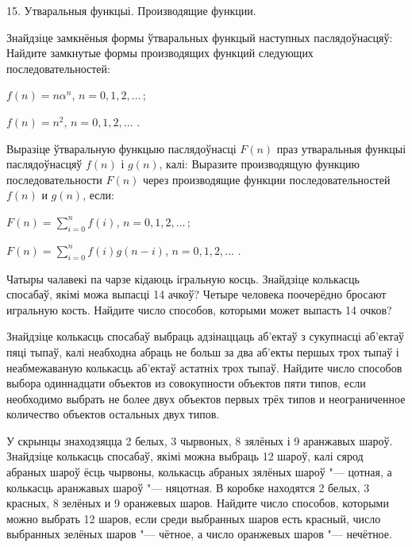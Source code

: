 



\biLangHeader
{15. Утваральныя функцыі.}
{Производящие функции.}

\begin{problemList}

\problemItemWithCommonPart
{Знайдзіце замкнёныя формы ўтваральных функцый наступных паслядоўнасцяў:}
{Найдите замкнутые формы производящих функций следующих последовательностей:}
{%
\begin{belarusianEnumerate}
  \item $f(n) = n\alpha^n$, $n = 0, 1, 2, \ldots\, $;
  \item $f(n) = n^2$, $n = 0, 1, 2, \ldots\,\, $.
\end{belarusianEnumerate}
}

\smallskip

\problemItemWithCommonPart
{Выразіце ўтваральную функцыю паслядоўнасці $F(n)$ праз утваральныя функцыі
паслядоўнасцяў $f(n)$ і $g(n)$, калі:}
{Выразите производящую функцию последовательности $F(n)$ через производящие
функции последовательностей $f(n)$ и $g(n)$, если:}
{%
\begin{belarusianEnumerate}
  \item $F(n) = \sum \limits _{i = 0}^n f(i)$, $n = 0, 1, 2, \ldots\, $;
  \item $F(n) = \sum \limits _{i = 0}^n f(i)g(n - i)$, $n = 0, 1, 2, \ldots\,\, $.
\end{belarusianEnumerate}
}

\medskip

\problemItemSimple
{Чатыры чалавекі па чарзе кідаюць ігральную косць. Знайдзіце колькасць спосабаў,
якімі можа выпасці 14 ачкоў?}
{Четыре человека поочерёдно бросают игральную кость. Найдите число способов,
которыми может выпасть 14 очков?}

\bigskip

\problemItemSimple
{Знайдзіце колькасць спосабаў выбраць адзінаццаць аб'ектаў з сукупнасці аб'ектаў
пяці тыпаў, калі неабходна абраць не больш за два аб'екты першых трох тыпаў і неабмежаваную
колькасць аб'ектаў астатніх трох тыпаў.}
{Найдите число способов выбора одиннадцати объектов из совокупности объектов
пяти типов, если необходимо выбрать не более двух объектов первых трёх типов и
неограниченное количество объектов остальных двух типов.}

\bigskip

\problemItemSimple
{У скрынцы знаходзяцца 2 белых, 3 чырвоных, 8 зялёных і 9 аранжавых шароў.
Знайдзіце колькасць спосабаў, якімі можна выбраць 12 шароў, калі сярод абраных шароў
ёсць чырвоны, колькасць абраных зялёных шароў "--- цотная, а колькасць аранжавых шароў "--- няцотная.}
{В коробке находятся 2 белых, 3 красных, 8 зелёных и 9 оранжевых шаров.
Найдите число способов, которыми можно выбрать 12 шаров, если среди выбранных шаров
есть красный, число выбранных зелёных шаров "--- чётное, а число оранжевых шаров "--- нечётное.}


\end{problemList}
